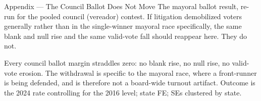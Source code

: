 
\begin{frame}{Appendix --- The Council Ballot Does Not Move}
\hypertarget{app:ballotcouncil}{}
\small
The mayoral ballot result, re-run for the pooled council (vereador) contest. If litigation demobilized voters generally rather than in the single-winner mayoral race specifically, the same blank and null rise and the same valid-vote fall should reappear here. They do not.
\smallskip
\begin{center}
\scriptsize
\resizebox{!}{0.22\textheight}{}
\end{center}
\smallskip
\footnotesize Every council ballot margin straddles zero: no blank rise, no null rise, no valid-vote erosion. The withdrawal is specific to the mayoral race, where a front-runner is being defended, and is therefore not a board-wide turnout artifact. Outcome is the 2024 rate controlling for the 2016 level; state FE; SEs clustered by state.\hfill\hyperlink{app:councilplacebo}{}
\end{frame}

